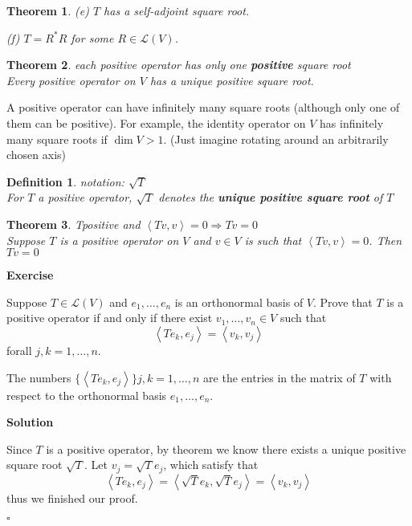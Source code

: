 \documentclass{article}
\newtheorem{theorem}{Theorem}[subsection]
\newtheorem{definition}{Definition}[subsection]
\newenvironment{exercise}{%
{\textbf{Exercise\\}
    }
}{
}
\newenvironment{solution}{%
{
    \textbf{Solution\\}
    }
}{
  \hfill $\square$ 
  \par\bigskip 
}
\begin{document}
\begin{CJK}{UTF8}{gkai}
\begin{theorem}
    (e) $T$ has a self-adjoint square root.

    (f) $T = R^\ast R$ for some $R \in \mathcal{L}(V)$.
\end{theorem}

\begin{theorem}
    each positive operator has only one \textbf{positive} square root\\

    Every positive operator on $V$ has a unique positive square root.
\end{theorem}

A positive operator can have infinitely many square roots (although only one of them can be positive). For example, the identity operator on $V$ has infinitely many square roots if $\dim V > 1$. (Just imagine rotating around an arbitrarily chosen axis)

\begin{definition}
    notation: $\sqrt{T}$\\

    For $T$ a positive operator, $\sqrt{T}$ denotes the \textbf{unique positive square root} of $T$
\end{definition}

\begin{theorem}
    Tpositive and $\left<Tv,v\right> = 0 \Rightarrow Tv = 0$\\

    Suppose $T$ is a positive operator on $V$ and $v \in V$ is such that $\left<Tv,v\right> = 0$. Then $Tv = 0$
\end{theorem}

\begin{exercise}
    Suppose $T\in\mathcal{L}(V)$ and $e_1,\ldots,e_n$ is an orthonormal basis of $V$. Prove that $T$ is a positive operator if and only if there exist $v_1,\ldots,v_n \in V$ such that
    \[\left<Te_k,e_j\right> = \left<v_k,v_j\right>\]
    forall $j,k=1,\ldots,n$.

    The numbers $\{\left<Te_k,e_j\right>\}j,k=1,\ldots,n$ are the entries in the matrix of $T$ with respect to the orthonormal basis $e_1,\ldots,e_n$.

\end{exercise}

\begin{solution}
    Since $T$ is a positive operator, by theorem we know there exists a unique positive square root $\sqrt{T}$. Let $v_j = \sqrt{T} e_j$, which satisfy that 
    \[\left<Te_k,e_j\right> = \left<\sqrt{T}e_k,\sqrt{T}e_j\right> = \left<v_k,v_j\right>\]
    thus we finished our proof.
\end{solution}


\end{CJK}
\end{document}
